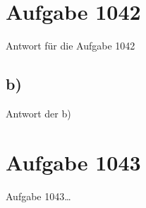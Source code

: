 \documentclass[12pt]{article} %
\begin{document}



\section*{Aufgabe 1042} %

Antwort für die Aufgabe 1042

\subsection*{b)}

Antwort der b)

\section*{Aufgabe 1043}

Aufgabe 1043\dots

\end{document}
